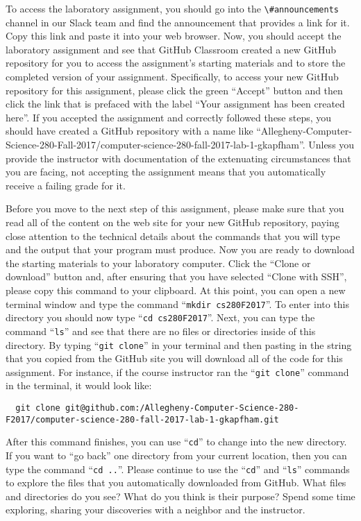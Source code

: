\documentclass[11pt]{article}
\newcommand{\command}[1]{``\lstinline{#1}''}
\newcommand{\channel}[1]{\lstinline{#1}}
\newcommand{\step}[1]{``{#1}''}
\begin{document}
To access the laboratory assignment, you should go into the \channel{\#announcements} channel in our Slack team and find
the announcement that provides a link for it. Copy this link and paste it into your web browser. Now, you should accept
the laboratory assignment and see that GitHub Classroom created a new GitHub repository for you to access the
assignment's starting materials and to store the completed version of your assignment. Specifically, to access your new
GitHub repository for this assignment, please click the green ``Accept'' button and then click the link that is prefaced
with the label ``Your assignment has been created here''. If you accepted the assignment and correctly followed these
steps, you should have created a GitHub repository with a name like
``Allegheny-Computer-Science-280-Fall-2017/computer-science-280-fall-2017-lab-1-gkapfham''. Unless you provide the
instructor with documentation of the extenuating circumstances that you are facing, not accepting the assignment means
that you automatically receive a failing grade for it.

Before you move to the next step of this assignment, please make sure that you read all of the content on the web site
for your new GitHub repository, paying close attention to the technical details about the commands that you will type
and the output that your program must produce. Now you are ready to download the starting materials to your laboratory
computer. Click the ``Clone or download'' button and, after ensuring that you have selected ``Clone with SSH'', please
copy this command to your clipboard. At this point, you can open a new terminal window and type the command
\command{mkdir cs280F2017}. To enter into this directory you should now type \command{cd cs280F2017}. Next, you can type
the command \command{ls} and see that there are no files or directories inside of this directory. By typing \command{git
clone} in your terminal and then pasting in the string that you copied from the GitHub site you will download all of the
code for this assignment. For instance, if the course instructor ran the \command{git clone} command in the terminal, it
would look like:

\begin{lstlisting}
  git clone git@github.com:/Allegheny-Computer-Science-280-F2017/computer-science-280-fall-2017-lab-1-gkapfham.git
\end{lstlisting}

After this command finishes, you can use \command{cd} to change into the new directory. If you want to \step{go back}
one directory from your current location, then you can type the command \command{cd ..}. Please continue to use the
\command{cd} and \command{ls} commands to explore the files that you automatically downloaded from GitHub. What files
and directories do you see? What do you think is their purpose? Spend some time exploring, sharing your discoveries with
a neighbor and the instructor.
\end{document}
